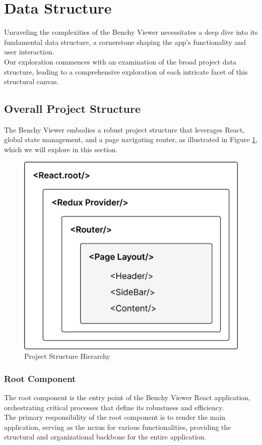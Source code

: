 \section{Data Structure}
Unraveling the complexities of the Benchy Viewer necessitates a deep dive into its fundamental data structure, a cornerstone shaping the app's functionality and user interaction.\\
Our exploration commences with an examination of the broad project data structure, leading to a comprehensive exploration of each intricate facet of this structural canvas.

\subsection{Overall Project Structure}

The Benchy Viewer embodies a robust project structure that leverages React, global state management, and a page navigating router, as illustrated in Figure \ref{fig:project-structure}, which we will explore in this section.

\begin{figure}[h]
  \vspace{0.5cm}
  \centering
  \includegraphics[width=0.5\linewidth]{figures/project-structure.png}
  \caption{Project Structure Hierarchy}
  \label{fig:project-structure}
\end{figure}

\subsubsection{Root Component}
The root component is the entry point of the Benchy Viewer React application, orchestrating critical processes that define its robustness and efficiency.\\
The primary responsibility of the root component is to render the main application, serving as the nexus for various functionalities, providing the structural and organizational backbone for the entire application. 

